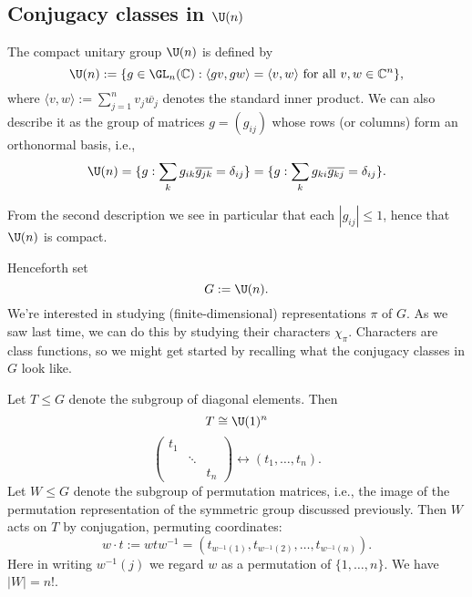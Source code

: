 \documentclass[reqno]{amsart} 
\begin{document}
\subsection{Conjugacy classes in \texorpdfstring{$\U(n)$}{U(n)}}
\begin{definition}
  The compact unitary group $\U(n)$ is defined by
  \begin{equation}
    \U(n) := \{g \in \GL_n(\mathbb{C}) : \langle g v, g w
    \rangle
    = \langle v, w \rangle \text{ for all } v,w
    \in \mathbb{C}^n\},
  \end{equation}
  where $\langle v, w \rangle := \sum_{j=1}^n v_j \overline{w_j}$ denotes the standard inner product.  We can also describe it as the group of matrices $g = (g_{i j})$ whose rows (or columns) form an orthonormal basis, i.e.,
  \begin{equation*}
    \U(n) = \{g : \sum_k g_{i k} \overline{g_{j k}} = \delta_{i j} \} = \{g : \sum_k g_{k i} \overline{g_{k j}} = \delta_{i j} \}.
  \end{equation*}
\end{definition}
From the second description we see in particular that each $|g_{i j}| \leq 1$, hence that $\U(n)$ is compact.

Henceforth set
\begin{equation*}
  G := \U(n).
\end{equation*}
We're interested in studying (finite-dimensional) representations $\pi$ of $G$.  As we saw last time, we can do this by studying their characters $\chi_\pi$.  Characters are class functions, so we might get started by recalling what the conjugacy classes in $G$ look like.

Let $T \leq G$ denote the subgroup of diagonal elements.  Then
\begin{equation*}
  T \cong \U(1)^n
\end{equation*}
\begin{equation*}
  \begin{pmatrix}
    t_1 &  &  \\
        & \ddots  &  \\
        & & t_n
  \end{pmatrix}
  \leftrightarrow (t_1,\dotsc,t_n).
\end{equation*}
Let $W \leq G$ denote the subgroup of permutation matrices, i.e., the image of the permutation representation of the symmetric group discussed previously.  Then $W$ acts on $T$ by conjugation, permuting coordinates:
\begin{equation*}
  w \cdot t := w t w^{-1} = (t_{w^{-1}(1)}, t_{w^{-1}(2)},\dotsc , t_{w^{-1}(n)}).
\end{equation*}
Here in writing $w^{-1}(j)$ we regard $w$ as a permutation of $\{1,\dotsc,n\}$.  We have $|W| = n!$.
\end{document}
